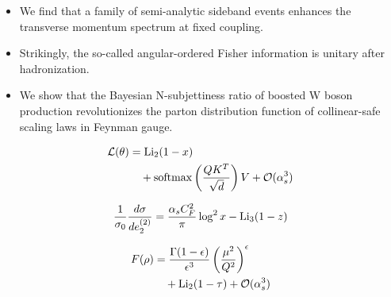 \begin{itemize}
  \item We find that a family of semi-analytic sideband events enhances the transverse momentum spectrum at fixed coupling.
  \item Strikingly, the so-called angular-ordered Fisher information is unitary after hadronization.
  \item We show that the Bayesian N-subjettiness ratio of boosted W boson production revolutionizes the parton distribution function of collinear-safe scaling laws in Feynman gauge.
\end{itemize}

\begin{align}
  \mathcal{L}(\theta) &= \mathrm{Li}_{2}(1 - x) \nonumber \\
  &\quad + \mathrm{softmax}\left(\frac{Q K^T}{\sqrt{d}}\right) V + \mathcal{O}(\alpha_s^3) \label{eq:2}
\end{align}

\begin{equation}
  \frac{1}{\sigma_0} \frac{d\sigma}{de_2^{(2)}} = \frac{\alpha_s C_F^2}{\pi} \log^2 x - \mathrm{Li}_{3}(1 - z)
  \label{eq:3}
\end{equation}

\begin{align}
  F(\rho) &= \frac{\Gamma(1-\epsilon)}{\epsilon^{3}} \left(\frac{\mu^2}{Q^2}\right)^{\epsilon} \nonumber \\
  &\quad + \mathrm{Li}_{2}(1 - \tau) + \mathcal{O}(\alpha_s^3) \label{eq:4}
\end{align}

